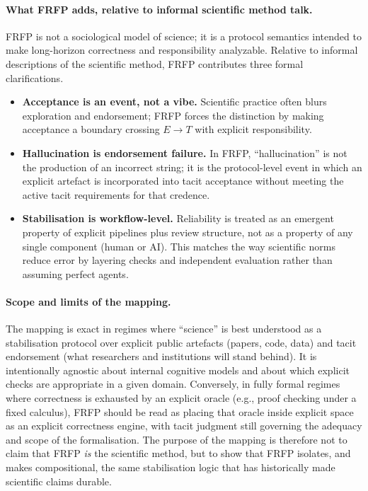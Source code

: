 \paragraph{What FRFP adds, relative to informal scientific method talk.}
FRFP is not a sociological model of science; it is a protocol semantics intended to make long-horizon correctness and responsibility analyzable. Relative to informal descriptions of the scientific method, FRFP contributes three formal clarifications.
\begin{itemize}[leftmargin=2em]
  \item \textbf{Acceptance is an event, not a vibe.} Scientific practice often blurs exploration and endorsement; FRFP forces the distinction by making acceptance a boundary crossing \(E\to T\) with explicit responsibility.
  \item \textbf{Hallucination is endorsement failure.} In FRFP, ``hallucination'' is not the production of an incorrect string; it is the protocol-level event in which an explicit artefact is incorporated into tacit acceptance without meeting the active tacit requirements for that credence.
  \item \textbf{Stabilisation is workflow-level.} Reliability is treated as an emergent property of explicit pipelines plus review structure, not as a property of any single component (human or AI). This matches the way scientific norms reduce error by layering checks and independent evaluation rather than assuming perfect agents.
\end{itemize}

\paragraph{Scope and limits of the mapping.}
The mapping is exact in regimes where ``science'' is best understood as a stabilisation protocol over explicit public artefacts (papers, code, data) and tacit endorsement (what researchers and institutions will stand behind). It is intentionally agnostic about internal cognitive models and about which explicit checks are appropriate in a given domain. Conversely, in fully formal regimes where correctness is exhausted by an explicit oracle (e.g., proof checking under a fixed calculus), FRFP should be read as placing that oracle inside explicit space as an explicit correctness engine, with tacit judgment still governing the adequacy and scope of the formalisation. The purpose of the mapping is therefore not to claim that FRFP \emph{is} the scientific method, but to show that FRFP isolates, and makes compositional, the same stabilisation logic that has historically made scientific claims durable.


